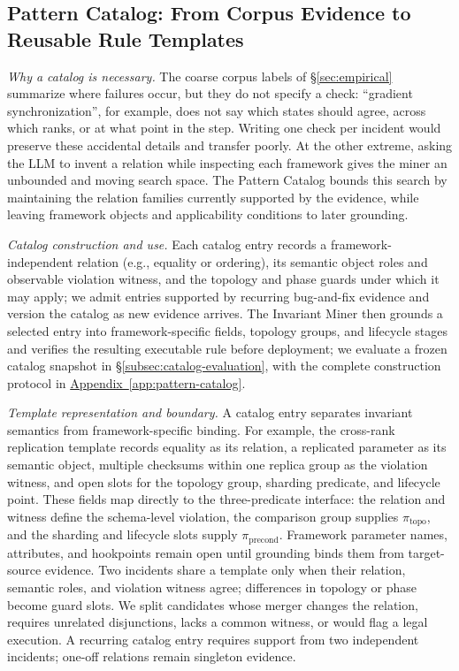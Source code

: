 \documentclass[sigconf,nonacm]{acmart}
\newcommand{\suppappendix}[1]{%
  \href{https://github.com/vivia-an/trainaudit-vldb-artifact/blob/vldb-2027-artifact-v1.0.1/paper/appendix_supplement.pdf}%
  {Appendix~\ref*{#1}}}
\begin{document}
\subsection{Pattern Catalog: From Corpus Evidence to Reusable Rule Templates}
\label{subsec:pattern_catalog}

\noindent\emph{Why a catalog is necessary.}
The coarse corpus labels of \S\ref{sec:empirical} summarize where failures
occur, but they do not specify a check: ``gradient synchronization'', for
example, does not say which states should agree, across which ranks, or at
what point in the step. Writing one check per incident would preserve these
accidental details and transfer poorly. At the other extreme, asking the LLM
to invent a relation while inspecting each framework gives the miner an
unbounded and moving search space. The Pattern Catalog bounds this search by
maintaining the relation families currently supported by the evidence, while
leaving framework objects and applicability conditions to later grounding.

\emph{Catalog construction and use.}
Each catalog entry records a framework-independent relation (e.g., equality
or ordering), its semantic object roles and observable violation witness, and
the topology and phase guards under which it may apply; we admit entries
supported by recurring bug-and-fix evidence and version the catalog as new
evidence arrives. The Invariant Miner then grounds a selected entry into
framework-specific fields, topology groups, and lifecycle stages and verifies
the resulting executable rule before deployment; we evaluate a frozen catalog
snapshot in \S\ref{subsec:catalog-evaluation}, with the complete construction
protocol in \suppappendix{app:pattern-catalog}.

\emph{Template representation and boundary.}
A catalog entry separates invariant semantics from framework-specific binding.
For example, the cross-rank replication template records equality as its
relation, a replicated parameter as its semantic object, multiple checksums
within one replica group as the violation witness, and open slots for the
topology group, sharding predicate, and lifecycle point. These fields map
directly to the three-predicate interface: the relation and witness define the
schema-level violation, the comparison group supplies $\pi_{\text{topo}}$, and
the sharding and lifecycle slots supply $\pi_{\text{precond}}$. Framework
parameter names, attributes, and hookpoints remain open until grounding binds
them from target-source evidence. Two incidents share a template only when
their relation, semantic roles, and violation witness agree; differences in
topology or phase become guard slots.
We split candidates whose merger changes the relation, requires unrelated
disjunctions, lacks a common witness, or would flag a legal execution. A
recurring catalog entry requires support from two independent incidents;
one-off relations remain singleton evidence.
\end{document}
